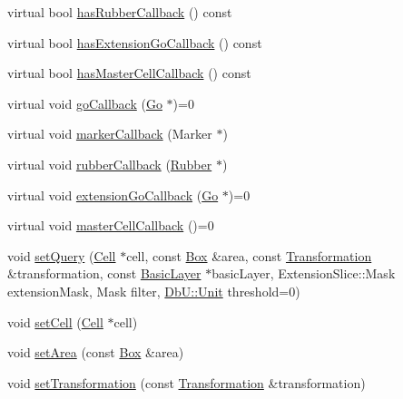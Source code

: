 \begin{DoxyCompactItemize}
\item 
virtual bool \mbox{\hyperlink{classHurricane_1_1Query_a5d49250d46dea1542bc3034f3eb1daee}{has\+Rubber\+Callback}} () const
\item 
virtual bool \mbox{\hyperlink{classHurricane_1_1Query_abd8ff8d187e4499e625feb12c68e9b29}{has\+Extension\+Go\+Callback}} () const
\item 
virtual bool \mbox{\hyperlink{classHurricane_1_1Query_a7ebb7b16bab183cd4508dc5639bd12ab}{has\+Master\+Cell\+Callback}} () const
\item 
virtual void \mbox{\hyperlink{classHurricane_1_1Query_a59007148bd0afa0405801f341e7e4139}{go\+Callback}} (\mbox{\hyperlink{classHurricane_1_1Go}{Go}} $\ast$)=0
\item 
virtual void \mbox{\hyperlink{classHurricane_1_1Query_a4ad5bf076073f107189d4b7ee48f040e}{marker\+Callback}} (Marker $\ast$)
\item 
virtual void \mbox{\hyperlink{classHurricane_1_1Query_acec322581e35c1556ce706aa5ea66aa3}{rubber\+Callback}} (\mbox{\hyperlink{classHurricane_1_1Rubber}{Rubber}} $\ast$)
\item 
virtual void \mbox{\hyperlink{classHurricane_1_1Query_a75b87e969b64caaf24ec058c0d2dfa68}{extension\+Go\+Callback}} (\mbox{\hyperlink{classHurricane_1_1Go}{Go}} $\ast$)=0
\item 
virtual void \mbox{\hyperlink{classHurricane_1_1Query_abaf97e93c7fa96469adf64f7865938b4}{master\+Cell\+Callback}} ()=0
\item 
void \mbox{\hyperlink{classHurricane_1_1Query_a70fce1e5b7754f1ec11097ad5b9ecfc9}{set\+Query}} (\mbox{\hyperlink{classHurricane_1_1Cell}{Cell}} $\ast$cell, const \mbox{\hyperlink{classHurricane_1_1Box}{Box}} \&area, const \mbox{\hyperlink{classHurricane_1_1Transformation}{Transformation}} \&transformation, const \mbox{\hyperlink{classHurricane_1_1BasicLayer}{Basic\+Layer}} $\ast$basic\+Layer, Extension\+Slice\+::\+Mask extension\+Mask, Mask filter, \mbox{\hyperlink{group__DbUGroup_ga4fbfa3e8c89347af76c9628ea06c4146}{Db\+U\+::\+Unit}} threshold=0)
\item 
void \mbox{\hyperlink{classHurricane_1_1Query_a36378e1604e484450a3ccee0ececcff7}{set\+Cell}} (\mbox{\hyperlink{classHurricane_1_1Cell}{Cell}} $\ast$cell)
\item 
void \mbox{\hyperlink{classHurricane_1_1Query_ac41de6b1535c256c4929c075769890b1}{set\+Area}} (const \mbox{\hyperlink{classHurricane_1_1Box}{Box}} \&area)
\item 
void \mbox{\hyperlink{classHurricane_1_1Query_a885360fc2f351fc3612c7dda363b5131}{set\+Transformation}} (const \mbox{\hyperlink{classHurricane_1_1Transformation}{Transformation}} \&transformation)

\end{DoxyCompactItemize}
